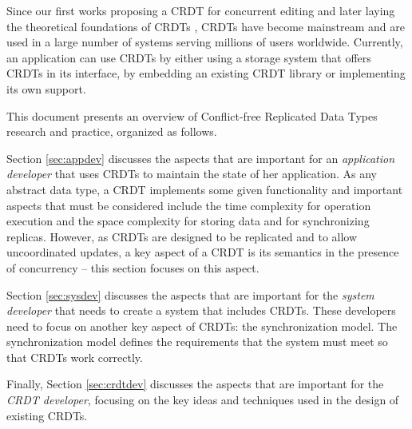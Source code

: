 \documentclass[11pt,a4paper]{article}
\begin{document}
Since our first works proposing a CRDT for concurrent 
editing \cite{DBLP:journals/corr/abs-0710-1784,Preguica09Commutative} and later laying the theoretical
foundations of CRDTs \cite{Shapiro11Conflict}, CRDTs have become mainstream 
and are used in a large number of systems serving millions of users
worldwide.
Currently, an application can use CRDTs by either using a storage system that offers
CRDTs in its interface,%
by embedding an existing CRDT library or implementing its own support.
 
This document presents an overview of Conflict-free Replicated Data Types
research and practice, organized as follows.

Section \ref{sec:appdev} discusses the aspects that are important 
for an \emph{application developer} that uses CRDTs to maintain the state
of her application.
As any abstract data type, a CRDT implements some given functionality and
important aspects that must be considered include 
the time complexity for operation execution and
the space complexity for storing data and for synchronizing replicas. 
However, as CRDTs are designed to be replicated and to allow uncoordinated 
updates, a key aspect of a CRDT is its semantics in the presence of concurrency
-- this section focuses on this aspect.

Section \ref{sec:sysdev} discusses the aspects that are important for the 
\emph{system developer} that needs to create a system that includes CRDTs.
These developers need to focus on another key aspect of CRDTs: the synchronization model. 
The synchronization model defines the requirements that the system must meet so that
CRDTs work correctly. 

Finally, Section \ref{sec:crdtdev} discusses the aspects that are important for the 
\emph{CRDT developer}, focusing on the key ideas and techniques used in 
the design of existing CRDTs.
\end{document}
